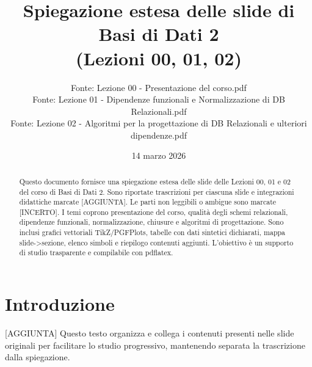 \documentclass[11pt]{article}
\title{Spiegazione estesa delle slide di Basi di Dati 2\\(Lezioni 00, 01, 02)}
\author{Fonte: Lezione 00 - Presentazione del corso.pdf\\Fonte: Lezione 01 - Dipendenze funzionali e Normalizzazione di DB Relazionali.pdf\\Fonte: Lezione 02 - Algoritmi per la progettazione di DB Relazionali e ulteriori dipendenze.pdf}
\date{14 marzo 2026}
\begin{document}
\begin{titlepage}\maketitle\end{titlepage}
\begin{abstract}
Questo documento fornisce una spiegazione estesa delle slide delle Lezioni 00, 01 e 02 del corso di Basi di Dati 2. Sono riportate trascrizioni per ciascuna slide e integrazioni didattiche marcate [AGGIUNTA]. Le parti non leggibili o ambigue sono marcate [INCERTO]. I temi coprono presentazione del corso, qualità degli schemi relazionali, dipendenze funzionali, normalizzazione, chiusure e algoritmi di progettazione. Sono inclusi grafici vettoriali TikZ/PGFPlots, tabelle con dati sintetici dichiarati, mappa slide->sezione, elenco simboli e riepilogo contenuti aggiunti. L'obiettivo è un supporto di studio trasparente e compilabile con pdflatex.
\end{abstract}
\tableofcontents
\listoffigures
\listoftables
\section{Introduzione}
[AGGIUNTA] Questo testo organizza e collega i contenuti presenti nelle slide originali per facilitare lo studio progressivo, mantenendo separata la trascrizione dalla spiegazione.
\end{document}
